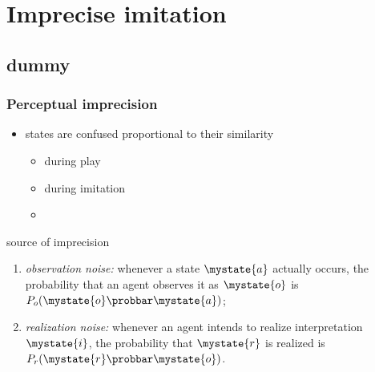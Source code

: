 \documentclass[fleqn,9pt,xcolor=dvipsnames]{beamer}
\begin{document}
\section{Imprecise imitation}
\subsection{dummy}

\begin{frame}
  \frametitle{Perceptual imprecision}
  
  \begin{itemize}
  \item[]  states are confused proportional to their similarity
    \vspace*{-0.25cm}
    \begin{multicols}{3}
      \begin{itemize}
      \item[] during play
      \item[] during imitation
        \item[]
      \end{itemize}
    \end{multicols}

  \end{itemize}


  \begin{block}{source of imprecision}
    \begin{enumerate}
    \item \emph{observation noise:} whenever a state $\mystate{a}$ actually occurs, the
      probability that an agent observes it as $\mystate{o}$ is
      $P_o(\mystate{o} \probbar \mystate{a})$;
    \item \emph{realization noise:} whenever an agent intends to realize interpretation
      $\mystate{i}$, the probability that $\mystate{r}$ is realized is
      $P_r(\mystate{r} \probbar \mystate{o})$.
    \end{enumerate}
  \end{block}


\end{frame}
\end{document}
